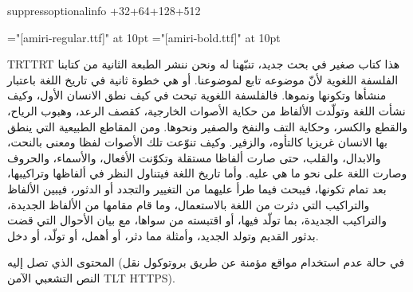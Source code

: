 \pdfvariable suppressoptionalinfo +32+64+128+512\relax




\font\amiriten="[amiri-regular.ttf]" at 10pt
\font\amiritenb="[amiri-bold.ttf]" at 10pt

\begingroup\pardir TRT\textdir TRT
\amiriten
هذا كتاب صغير في بحث جديد، تنبّهنا له ونحن ننشر الطبعة الثانية من كتابنا الفلسفة
اللغوية لأنّ موضوعه تابع لموضوعنا. أو هي خطوة ثانية في تاريخ اللغة باعتبار
منشأها وتكونها ونموها. فالفلسفة اللغوية تبحث في كيف نطق الانسان الأول، وكيف
نشأت اللغة وتولّدت الألفاظ من حكاية الأصوات الخارجية، ك{\amiritenb قصف الرعد}، وهبوب الرياح،
والقطع والكسر، وحكاية التف والنفخ والصفير ونحوها. ومن المقاطع الطبيعية التي
ينطق بها الانسان غريزيا كالتأوه، والزفير. وكيف تنوّعت تلك الأصوات لفظا ومعنى
بالنحت، والابدال، والقلب، حتى صارت ألفاظا مستقلة وتكوّنت الأفعال، والأسماء،
والحروف وصارت اللغة على نحو ما هي عليه.  وأما تاريخ اللغة فيتناول النظر في
ألفاظها وتراكيبها، بعد تمام تكونها، فيبحث فيما طرأ عليهما من التغيير والتجدد أو
الدثور، فيبين الألفاظ والتراكيب التي دثرت من اللغة بالاستعمال، وما قام مقامها
من الألفاظ الجديدة، والتراكيب الجديدة، بما تولّد فيها، أو اقتبسته من سواها، مع
بيان الأحوال التي قضت بدثور القديم وتولد الجديد، وأمثلة مما دثر، أو أهمل، أو
تولّد، أو دخل.

المحتوى الذي تصل إليه (في حالة عدم استخدام مواقع مؤمنة عن طريق بروتوكول نقل
النص التشعبي الآمن {\textdir TLT HTTPS}).
\par\endgroup\vfill\eject

\def\arabictext{%
هذا كتاب صغير في بحث جديد، تنبّهنا له ونحن ننشر الطبعة الثانية من كتابنا الفلسفة
اللغوية لأنّ موضوعه تابع لموضوعنا. أو هي خطوة ثانية في تاريخ اللغة باعتبار
منشأها وتكونها ونموها. فالفلسفة اللغوية تبحث في كيف نطق الانسان الأول، وكيف
نشأت اللغة وتولّدت الألفاظ من حكاية الأصوات الخارجية، كقصف الرعد، وهبوب الرياح،
والقطع والكسر، وحكاية التف والنفخ والصفير ونحوها. ومن المقاطع الطبيعية التي
ينطق بها الانسان غريزيا كالتأوه، والزفير. وكيف تنوّعت تلك الأصوات لفظا ومعنى
بالنحت، والابدال، والقلب، حتى صارت ألفاظا مستقلة وتكوّنت الأفعال، والأسماء،
والحروف وصارت اللغة على نحو ما هي عليه.  وأما تاريخ اللغة فيتناول النظر في
ألفاظها وتراكيبها، بعد تمام تكونها، فيبحث فيما طرأ عليهما من التغيير والتجدد أو
الدثور، فيبين الألفاظ والتراكيب التي دثرت من اللغة بالاستعمال، وما قام مقامها
من الألفاظ الجديدة، والتراكيب الجديدة، بما تولّد فيها، أو اقتبسته من سواها، مع
بيان الأحوال التي قضت بدثور القديم وتولد الجديد، وأمثلة مما دثر، أو أهمل، أو
تولّد، أو دخل.%
}

